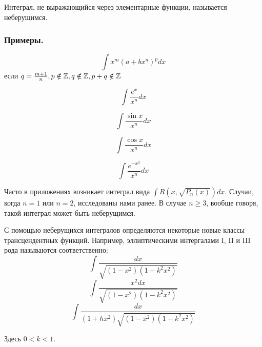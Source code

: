 \opred

Интеграл, не выражающийся через элементарные функции, называется неберущимся.

\subsubsection{Примеры.}
$$\int x^m(a+bx^n)^p dx$$
если $q=\frac{m+1}{n}, p \notin \mathbb{Z}, q \notin\mathbb{Z}, p+q\notin \mathbb{Z}$

$$\int \frac{e^x}{x^n}dx$$

$$\int \frac{\sin x}{x^n}dx$$

$$\int \frac{\cos x}{x^n}dx$$

$$\int \frac{e^{-x^2}}{x^n}dx$$

Часто в приложениях возникает интеграл вида $\int R(x,\sqrt{P_n(x)})dx$. Случаи, когда $n=1$ или $n=2$, исследованы нами ранее. В случае $n \geq 3$, вообще говоря, такой интеграл может быть неберущимся.

С помощью неберущихся интегралов определяются некоторые новые классы трансцендентных функций. Например, эллиптическими интергалами I, II и III рода называются соответственно:
$$\int \frac{dx}{\sqrt{(1-x^2)(1-k^2 x^2)}}$$
$$\int \frac{x^2 dx}{\sqrt{(1-x^2)(1-k^2 x^2)}}$$
$$\int \frac{dx}{(1+hx^2)\sqrt{(1-x^2)(1-k^2 x^2)}}$$

Здесь $0<k<1$.

